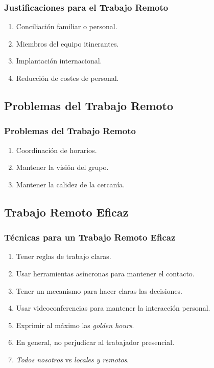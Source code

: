 \documentclass[a4paper,t,xcolor=pst,dvips]{beamer}
\begin{document}
\begin{frame}[c]
	\frametitle{Justificaciones para el Trabajo Remoto}
	\begin{enumerate}[<+->]
        \item Conciliación familiar o personal.
        \item Miembros del equipo itinerantes.
        \item Implantación internacional.
        \item Reducción de costes de personal.
	\end{enumerate}
\end{frame}

\subsection{Problemas del Trabajo Remoto}

\begin{frame}[c]
	\frametitle{Problemas del Trabajo Remoto}
	\begin{enumerate}[<+->]
        \item Coordinación de horarios.
        \item Mantener la visión del grupo.
        \item Mantener la calidez de la cercanía.
	\end{enumerate}
\end{frame}

\subsection{Trabajo Remoto Eficaz}

\begin{frame}[c]
	\frametitle{Técnicas para un Trabajo Remoto Eficaz}
	\begin{enumerate}[<+->]
        \item Tener reglas de trabajo claras.
        \item Usar herramientas asíncronas para mantener el contacto.
        \item Tener un mecanismo para hacer claras las decisiones.
        \item Usar videoconferencias para mantener la interacción personal.
        \item Exprimir al máximo las \emph{golden hours}.
        \item En general, no perjudicar al trabajador presencial.
        \item \emph{Todos nosotros} vs \emph{locales y remotos}.
	\end{enumerate}
\end{frame}
\end{document}
